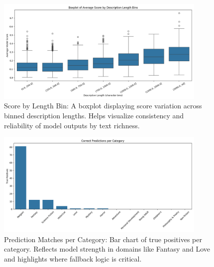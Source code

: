 \begin{figure}[H]
    \centering
    \includegraphics[width=0.9\textwidth]{figures/category_refined_avg_score_by_length_bin.png}
    \caption{Score by Length Bin: A boxplot displaying score variation across binned description lengths. Helps visualize consistency and reliability of model outputs by text richness.}
\end{figure}

\begin{figure}[H]
    \centering
    \includegraphics[width=0.9\textwidth]{figures/refine_category_prediction_matches.png}
    \caption{Prediction Matches per Category: Bar chart of true positives per category. Reflects model strength in domains like Fantasy and Love and highlights where fallback logic is critical.}
\end{figure}